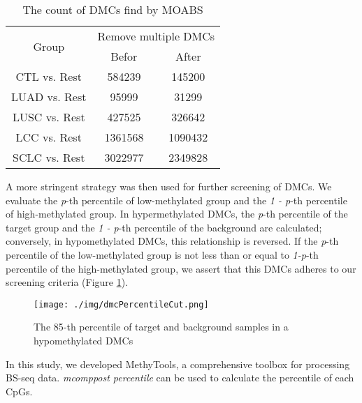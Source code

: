 \documentclass[10pt]{article}
\begin{document}
\begin{table}[htbp]
    \begin{center}
        \caption{The count of DMCs find by MOABS}
        \begin{tabular}{|c|c|c|}
            \hline
            \multirow{2}{*}{Group} & \multicolumn{2}{c|}{Remove multiple DMCs}           \\
            \cline{2-3}            & Befor                                     & After   \\
            \hline
            CTL vs. Rest           & 584239                                    & 145200  \\
            LUAD vs. Rest          & 95999                                     & 31299   \\
            LUSC vs. Rest          & 427525                                    & 326642  \\
            LCC vs. Rest           & 1361568                                   & 1090432 \\
            SCLC vs. Rest          & 3022977                                   & 2349828 \\
            \hline
        \end{tabular}
    \end{center}
    \label{tab:table_dmc_ount}
\end{table}

A more stringent strategy was then used for further screening of DMCs. We evaluate the \textit{p}-th percentile of low-methylated group
and the \textit{1 - p}-th percentile of high-methylated group. In hypermethylated DMCs, the \textit{p}-th percentile of the target
group and the \textit{1 - p}-th percentile of the background are calculated; conversely, in hypomethylated DMCs, this relationship is
reversed. If the \textit{p}-th percentile of the low-methylated group is not less than or equal to \textit{1-p}-th percentile of the
high-methylated group, we assert that this DMCs adheres to our screening criteria (Figure \ref*{fig:dmcPC}).

\begin{figure}[htbp]
    \centering
    \texttt{[image: ./img/dmcPercentileCut.png]}
    \caption{The 85-th percentile of target and background samples in a hypomethylated DMCs}
    \label{fig:dmcPC}
\end{figure}

In this study, we developed MethyTools, a comprehensive toolbox for processing BS-seq data. \emph{mcomppost percentile} can be used to calculate
the percentile of each CpGs.
\end{document}
